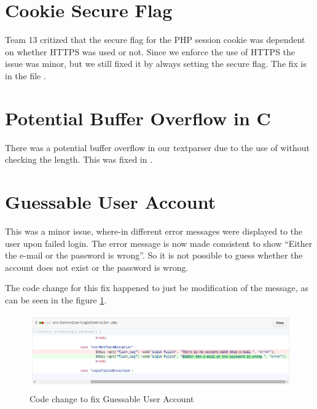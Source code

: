 \section{Cookie Secure Flag}
Team 13 critized that the secure flag for the PHP session cookie was dependent on whether HTTPS was used or not. Since we enforce the use of HTTPS the issue was minor, but we still fixed it by always setting the secure flag. The fix is in the file .

\section{Potential Buffer Overflow in C}
There was a potential buffer overflow in our textparser due to the use of  without checking the length. This was fixed in .

\section{Guessable User Account}
This was a minor issue, where-in different error messages were displayed to the user upon failed login. The error message is now made consistent to show \enquote{Either the e-mail or the password is wrong}. So it is not possible to guess whether the account does not exist or the password is wrong.

The code change for this fix happened to just be modification of the message, as can be seen in the figure \ref{fig:fix_guessable_account}.

\begin{figure}[ht]
	\centering
	\includegraphics[width=.8\linewidth]{figures/fix_guessable_account.png}
	\caption{Code change to fix Guessable User Account}
	\label{fig:fix_guessable_account}
\end{figure}

\clearpage